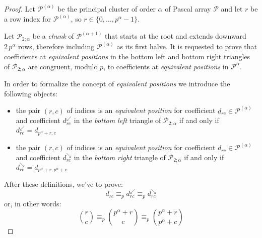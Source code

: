 \begin{proof}

  Let $\mathcal{P}^{(\alpha)}$ be the principal cluster of order $\alpha$ of
  Pascal array $\mathcal{P}$ and let $r$ be a row index for
  $\mathcal{P}^{(\alpha)}$, so $r \in \lbrace 0, \ldots, p^{\alpha} -1
  \rbrace$.
    
  Let $\mathcal{P}_{2;\alpha}$ be a \emph{chunk} of $\mathcal{P}^{(\alpha +1)}$
  that starts at the root and extends downward $2\,p^{\alpha}$ rows, therefore
  including $\mathcal{P}^{(\alpha)}$ as its first halve. It is requested to
  prove that coefficients at \emph{equivalent positions} in the bottom left and
  bottom right triangles of $\mathcal{P}_{2;\alpha}$ are congruent, modulo $p$,
  to coefficients at \emph{equivalent positions} in $\mathcal{P}^{\alpha}$. 
  
  In order to formalize  the concept of \emph{equivalent positions} we
  introduce the following objects: 
  \begin{itemize}
    \item the pair $(r,c)$ of indices is an \emph{equivalent position} 
        for coefficient $d_{rc}\in\mathcal{P}^{(\alpha)}$ and coefficient 
            $d_{rc}^{\swarrow}$ in the \emph{bottom left} triangle of $\mathcal{P}_{2;\alpha}$ if and only if
                $d_{rc}^{\swarrow} = d_{p^{\alpha}+r,c}$
    \item the pair $(r,c)$ of indices is an \emph{equivalent position} 
        for coefficient $d_{rc}\in\mathcal{P}^{(\alpha)}$ and coefficient 
            $d_{rc}^{\searrow}$ in the \emph{bottom right} triangle of $\mathcal{P}_{2;\alpha}$ if and only if
                $d_{rc}^{\searrow} = d_{p^{\alpha}+r,p^{\alpha}+c}$
  \end{itemize}
  
  After these definitions, we've to prove:
  \begin{displaymath}
    d_{rc} \equiv_p d_{rc}^{\swarrow} \equiv_p d_{rc}^{\searrow} 
  \end{displaymath}
  or, in other words:
  \begin{displaymath}
    {{r} \choose {c}} \equiv_p {{p^{\alpha}+r} \choose {c}} \equiv_p {{p^{\alpha}+r} \choose {p^{\alpha}+c}} 
  \end{displaymath}


\end{proof}
